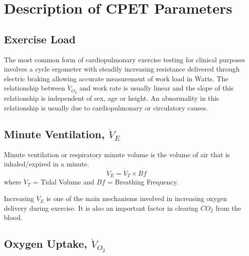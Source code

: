 \clearpage

\section{Description of CPET Parameters}
\label{sec:cpx_parameters}


\subsection{Exercise Load}
The most common form of cardiopulmonary exercise testing for clinical purposes involves a cycle ergometer with steadily increasing resistance delivered through electric braking allowing accurate measurement of work load in Watts. The relationship between $\dot{V}_{O_2}$ and work rate is usually linear and the slope of this relationship is independent of sex, age or height. An abnormality in this relationship is usually due to cardiopulmonary or circulatory causes.

\subsection{Minute Ventilation, $\dot{V}_E$}
Minute ventilation or respiratory minute volume is the volume of air that is inhaled/expired in a minute.
\begin{equation} \label{eq:VE=VTxBf}
	\dot{V}_E = \dot{V}_T \times Bf
\end{equation}
where $\dot{V}_T$ = Tidal Volume and $Bf$ = Breathing Frequency.

Increasing $\dot{V}_E$ is one of the main mechanisms involved in increasing oxygen delivery during exercise. It is also an important factor in clearing $CO_2$ from the blood.

\subsection{Oxygen Uptake, $\dot{V}_{O_2}$}

